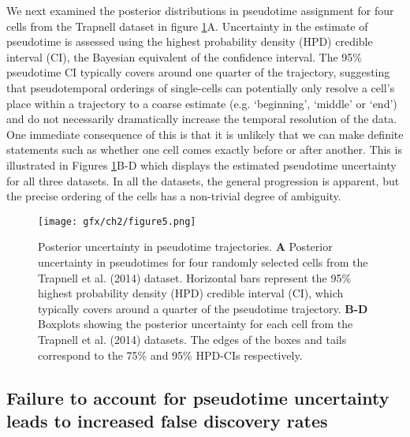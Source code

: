 We next examined the posterior distributions in pseudotime assignment for four cells from the Trapnell dataset in figure \ref{fig:posuncert}A. Uncertainty in the estimate of pseudotime is assessed using the highest probability density (HPD) credible interval (CI), the Bayesian equivalent of the confidence interval. The 95\% pseudotime CI typically covers around one quarter of the trajectory, suggesting that pseudotemporal orderings of single-cells can potentially only resolve a cell's place within a trajectory to a coarse estimate (e.g. `beginning', `middle' or `end') and do not necessarily dramatically increase the temporal resolution of the data. One immediate consequence of this is that it is unlikely that we can make definite statements such as whether one cell comes exactly before or after another. This is illustrated in Figures \ref{fig:posuncert}B-D which displays the estimated pseudotime uncertainty for all three datasets. In all the datasets, the general progression is apparent, but the precise ordering of the cells has a non-trivial degree of ambiguity.

\begin{figure}
\centering
	\texttt{[image: gfx/ch2/figure5.png]}
    \caption[Posterior uncertainty in pseudotime trajectories.]{ Posterior uncertainty in pseudotime trajectories.  \textbf{A} Posterior uncertainty in pseudotimes for four randomly selected cells from the Trapnell et al. (2014) dataset. Horizontal bars represent the 95\% highest probability density (HPD) credible interval (CI), which typically covers around a quarter of the pseudotime trajectory. \textbf{B-D} Boxplots showing the posterior uncertainty for each cell from the Trapnell et al. (2014) datasets. The edges of the boxes and tails correspond to the 75\% and 95\% HPD-CIs respectively.} \label{fig:posuncert}
\end{figure}


\subsection{Failure to account for pseudotime uncertainty leads to increased false discovery rates}

